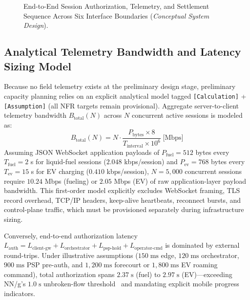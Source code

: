 \begin{figure}[!htbp]
  \centering
  
  \caption{End-to-End Session Authorization, Telemetry, and Settlement Sequence Across Six Interface Boundaries (\emph{Conceptual System Design}).}
  \label{fig:sequence-auth}
\end{figure}

\subsection{Analytical Telemetry Bandwidth and Latency Sizing Model}
\label{sec:sizing-model}

Because no field telemetry exists at the preliminary design stage, preliminary capacity planning relies on an explicit analytical model tagged \texttt{[Calculation]} + \texttt{[Assumption]} (all NFR targets remain provisional). Aggregate server-to-client telemetry bandwidth $B_{\text{total}}(N)$ across $N$ concurrent active sessions is modeled as:
\begin{equation}
  B_{\text{total}}(N) = N \cdot \frac{P_{\text{bytes}} \times 8}{T_{\text{interval}} \times 10^6}\;\text{[Mbps]}
  \label{eq:bandwidth}
\end{equation}
Assuming JSON WebSocket application payloads of $P_{\text{fuel}} = 512$ bytes every $T_{\text{fuel}} = 2$ s for liquid-fuel sessions ($2.048$ kbps/session) and $P_{\text{ev}} = 768$ bytes every $T_{\text{ev}} = 15$ s for EV charging ($0.410$ kbps/session), $N = 5{,}000$ concurrent sessions require $10.24$ Mbps (fueling) or $2.05$ Mbps (EV) of raw application-layer payload bandwidth. This first-order model explicitly excludes WebSocket framing, TLS record overhead, TCP/IP headers, keep-alive heartbeats, reconnect bursts, and control-plane traffic, which must be provisioned separately during infrastructure sizing.

Conversely, end-to-end authorization latency $L_{\text{auth}} = L_{\text{client-gw}} + \allowbreak L_{\text{orchestrator}} + \allowbreak L_{\text{psp-hold}} + \allowbreak L_{\text{operator-cmd}}$ is dominated by external round-trips. Under illustrative assumptions ($150\;\text{ms}$ edge, $120\;\text{ms}$ orchestrator, $900\;\text{ms}$ PSP pre-auth, and $1{,}200\;\text{ms}$ forecourt or $1{,}800\;\text{ms}$ EV roaming command), total authorization spans $2.37\;\text{s}$ (fuel) to $2.97\;\text{s}$ (EV)---exceeding NN/g's $1.0\;\text{s}$ unbroken-flow threshold~\cite{nielsen1993responsetimes} and mandating explicit mobile progress indicators.

